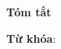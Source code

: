 \begin{center}
\textbf{\large{Tóm tắt}	}
\end{center}


\begin{small}



\vspace*{1cm}
\textbf{Từ khóa}: 

\end{small}